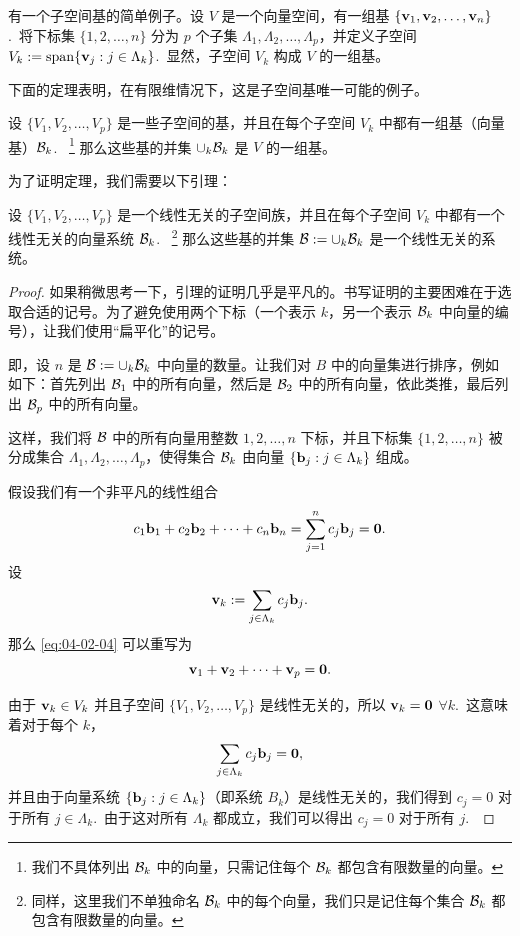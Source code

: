 有一个子空间基的简单例子。设 $V$ 是一个向量空间，有一组基 $\{\mathbf{v}_1, \mathbf{v}_2, \dots, \mathbf{v}_n\}$.~将下标集 $\{1, 2, \dots, n\}$ 分为 $p$ 个子集 $\Lambda_1, \Lambda_2, \dots, \Lambda_p$，并定义子空间 $V_k := \operatorname{span}\{\mathbf{v}_j : j \in \Lambda_k\}$.~显然，子空间 $V_k$ 构成 $V$ 的一组基。

下面的定理表明，在有限维情况下，这是子空间基唯一可能的例子。

\begin{theorem}\label{stmt:04-02-06} 设 $\{V_1, V_2, \dots, V_p\}$ 是一些子空间的基，并且在每个子空间 $V_k$ 中都有一组基（向量基）$\mathcal{B}_k$.~
\footnote{
我们不具体列出 $\mathcal{B}_k$ 中的向量，只需记住每个 $\mathcal{B}_k$ 都包含有限数量的向量。
}
那么这些基的并集 $\cup_k \mathcal{B}_k$ 是 $V$ 的一组基。\end{theorem}

为了证明定理，我们需要以下引理：

\begin{lemma}\label{stmt:04-02-07} 设 $\{V_1, V_2, \dots, V_p\}$ 是一个线性无关的子空间族，并且在每个子空间 $V_k$ 中都有一个线性无关的向量系统 $\mathcal{B}_k$.~
\footnote{
同样，这里我们不单独命名 $\mathcal{B}_k$ 中的每个向量，我们只是记住每个集合 $\mathcal{B}_k$ 都包含有限数量的向量。
}
那么这些基的并集 $\mathcal{B} := \cup_k \mathcal{B}_k$ 是一个线性无关的系统。\end{lemma}

\begin{proof}如果稍微思考一下，引理的证明几乎是平凡的。书写证明的主要困难在于选取合适的记号。为了避免使用两个下标（一个表示 $k$，另一个表示 $\mathcal{B}_k$ 中向量的编号），让我们使用“扁平化”的记号。

即，设 $n$ 是 $\mathcal{B} := \cup_k \mathcal{B}_k$ 中向量的数量。让我们对 $B$ 中的向量集进行排序，例如如下：首先列出 $\mathcal{B}_1$ 中的所有向量，然后是 $\mathcal{B}_2$ 中的所有向量，依此类推，最后列出 $\mathcal{B}_p$ 中的所有向量。

这样，我们将 $\mathcal{B}$ 中的所有向量用整数 $1, 2, \dots, n$ 下标，并且下标集 $\{1, 2, \dots, n\}$ 被分成集合 $\Lambda_1, \Lambda_2, \dots, \Lambda_p$，使得集合 $\mathcal{B}_k$ 由向量 $\{\mathbf{b}_j : j \in \Lambda_k\}$ 组成。

假设我们有一个非平凡的线性组合
\begin{equation}\label{eq:04-02-04}
c_1 \mathbf{b}_1 + c_2 \mathbf{b}_2 + \dots + c_n \mathbf{b}_n = \sum_{j=1}^n c_j \mathbf{b}_j = \mathbf{0}.
\end{equation}
设 $$\mathbf{v}_k := \sum_{j \in \Lambda_k} c_j \mathbf{b}_j.$$
那么 \eqref{eq:04-02-04} 可以重写为
$$\mathbf{v}_1 + \mathbf{v}_2 + \dots + \mathbf{v}_p = \mathbf{0}.$$

由于 $\mathbf{v}_k \in V_k$ 并且子空间 $\{V_1, V_2, \dots, V_p\}$ 是线性无关的，所以 $\mathbf{v}_k = \mathbf{0}$ $\forall k$.~这意味着对于每个 $k$，
$$\sum_{j \in \Lambda_k} c_j \mathbf{b}_j = \mathbf{0},$$
并且由于向量系统 $\{\mathbf{b}_j : j \in \Lambda_k\}$（即系统 $B_k$）是线性无关的，我们得到 $c_j = 0$ 对于所有 $j \in \Lambda_k$.~由于这对所有 $\Lambda_k$ 都成立，我们可以得出 $c_j = 0$ 对于所有 $j$.~\end{proof}


